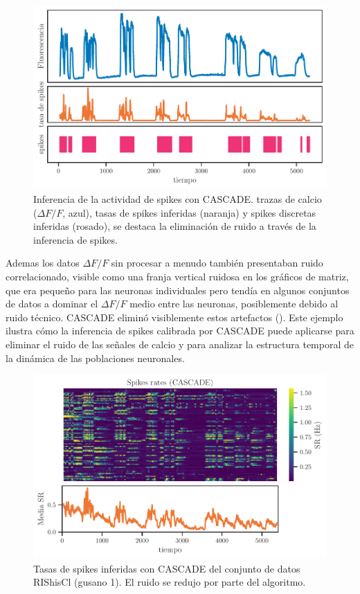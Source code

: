     \begin{figure}[h!]
	\centering{}\includegraphics[width=\imsize]{cascade_spikes.pdf}
	\caption[Inferencia de la actividad de spikes con CASCADE.]{Inferencia de la actividad de spikes con CASCADE.  trazas de calcio ($\Delta F/F$, azul), tasas de spikes inferidas (naranja) y spikes discretas inferidas (rosado), se  destaca la eliminación de ruido a través de la inferencia de spikes.}\label{f:cascade_spikes}  
\end{figure}

Ademas los datos $\Delta F/F$ sin procesar a menudo también presentaban ruido correlacionado, visible como una franja vertical ruidosa en los gráficos de matriz, que era pequeño para las neuronas individuales pero tendía en algunos conjuntos de datos a dominar el $\Delta F/F$ medio entre las neuronas, posiblemente debido al ruido técnico. CASCADE eliminó visiblemente estos artefactos (). Este ejemplo ilustra cómo la inferencia de spikes calibrada por CASCADE puede aplicarse para eliminar el ruido de las señales de calcio y para analizar la estructura temporal de la dinámica de las poblaciones neuronales. 


    \begin{figure}[h!]
	\centering{}\includegraphics[width=\imsize]{cascade_2.pdf}
	\caption[Tasas de spikes inferidas con CASCADE  del conjunto de datos RIShisCl  (gusano 1).]{Tasas de spikes inferidas con CASCADE  del conjunto de datos RIShisCl  (gusano 1). El ruido se redujo por parte del algoritmo.}\label{f:cascade_2}  
\end{figure}

